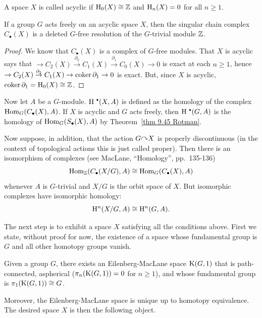 \begin{defn}
    A space $X$ is called acyclic if $\mathrm{H}_0(X)\cong \mathbb{Z}$ and $\mathrm{H}_n(X)=0$ for all $n\geq 1$.
\end{defn}

\begin{thm}\label{thm 9.45 Rotman}
    If a group $G$ acts freely on an acyclic space $X$, then the singular chain complex $C_\bullet(X)$ is a deleted $G$-free resolution of the $G$-trivial module $\mathbb{Z}$.
\end{thm}
\begin{proof}
    We know that $C_\bullet(X)$ is a complex of $G$-free modules. That $X$ is acyclic says that $\to C_2(X)\overset{\partial_2}{\to}C_1(X)\overset{\partial_1}{\to}C_0(X)\to 0$ is exact at each $n\geq 1$, hence $\to C_2(X)\overset{\partial_2}{\to}C_1(X)\to \operatorname{coker} \partial_1\to 0$ is exact. But, since $X$ is acyclic, $\operatorname{coker} \partial_1=\mathrm{H}_0(X)\cong \mathbb{Z}$.
\end{proof}

Now let $A$ be a $G$-module. $\rmH^{\smbullet }(X,A)$ is defined as the homology of the complex $\operatorname{Hom}_G(C_\bullet(X),A)$. If $X$ is acyclic and $G$ acts freely, then $\rmH^{\smbullet }(G,A)$ is the homology of $\operatorname{Hom}_G(S_\bullet(X),A)$ by Theorem~\ref{thm 9.45 Rotman}. 

Now suppose, in addition, that the action $G\acts X$ is properly discontinuous (in the context of topological actions this is just called proper). Then there is an isomorphism of complexes (see MacLane, ``Homology'', pp.~135-136)
\[\operatorname{Hom}_{\mathbb{Z}}(C_\bullet(X\slash G),A)\cong \operatorname{Hom}_G(C_\bullet(X),A)\]
whenever $A$ is $G$-trivial and $X\slash G$ is the orbit space of $X$. But isomorphic complexes have isomorphic homology:
\[\mathrm{H}^n(X\slash G,A)\cong \mathrm{H}^n(G,A).\label{eq 2 rotman}\]

The next step is to exhibit a space $X$ satisfying all the conditions above. First we state, without proof for now, the existence of a space whose fundamental group is $G$ and all other homotopy groups vanish.

\begin{defn}
    Given a group $G$, there exists an Eilenberg-MacLane space $\mathrm{K}(G,1)$ that is path-connected, aspherical ($\pi_n(\mathrm{K}(G,1))=0$ for $n\geq 1$), and whose fundamental group is $\pi_1(\mathrm{K}(G,1))\cong G$.
\end{defn}

Moreover, the Eilenberg-MacLane space is unique up to homotopy equivalence. The desired space $X$ is then the following object.

